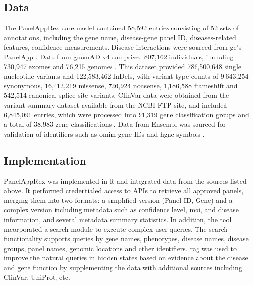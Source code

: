 \subsection{Data}
The PanelAppRex core model contained 58,592 entries consisting of 52 sets of annotations, including the gene name, disease-gene panel ID, diseases-related features, confidence measurements.
Disease interactions were sourced from \ac{ge}’s PanelApp
\cite{martin_panelapp_2019}.
Data from gnomAD v4 comprised 807,162 individuals, including 730,947 exomes and 76,215 genomes \cite{karczewski2020mutational}. This dataset provided 786,500,648 single nucleotide variants and 122,583,462 InDels, with variant type counts of 9,643,254 synonymous, 16,412,219 missense, 726,924 nonsense, 1,186,588 frameshift and 542,514 canonical splice site variants. ClinVar data were obtained from the variant summary dataset 
 available from the NCBI FTP site, and included 6,845,091 entries, which were processed into 91,319 gene classification groups and a total of 38,983 gene classifications 
\cite{landrum_clinvar_2018}. 
Data from Ensembl was sourced for validation of identifiers such as \ac{omim} gene IDs and \ac{hgnc} symbols
\cite{dyer_ensembl_2025}.

\subsection{Implementation}
\noindent
PanelAppRex was implemented in R and integrated data from the sources listed above.
It performed credentialed access to APIs to retrieve all approved panels, merging them into two formats: a simplified version (Panel ID, Gene) and a complex version including metadata such as confidence level, \ac{moi}, and disease information, and several metadata summary statistics. In addition, the tool incorporated a search module to execute complex user queries. The search functionality supports queries by gene names, phenotypes, disease names, disease groups, panel names, genomic locations and other identifiers. 
\ac{rag} was used to improve the natural queries in hidden states based on evidence about the disease and gene function by supplementing the data with additional sources including ClinVar, UniProt, etc. 

